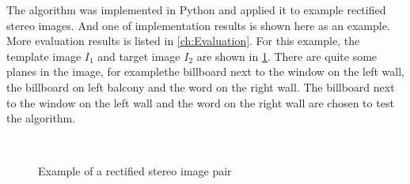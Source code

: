 The algorithm was implemented in Python and applied it to example rectified stereo images. And one of implementation results is shown here as an example. More evaluation results is listed in \cref{ch:Evaluation}. For this example, the template image $I_1$ and target image $I_2$ are shown in \cref{fig:Example rectified stereo images}. There are quite some planes in the image, for examplethe billboard next to the window on the left wall,  the billboard on left balcony and the word on the right wall.  The billboard next to the window on the left wall and the word on the right wall are chosen to test the algorithm. 
\begin{figure}[tbp]\centering
	 \\
	\caption{Example of a rectified stereo image pair }
	\label{fig:Example rectified stereo images}
\end{figure}

